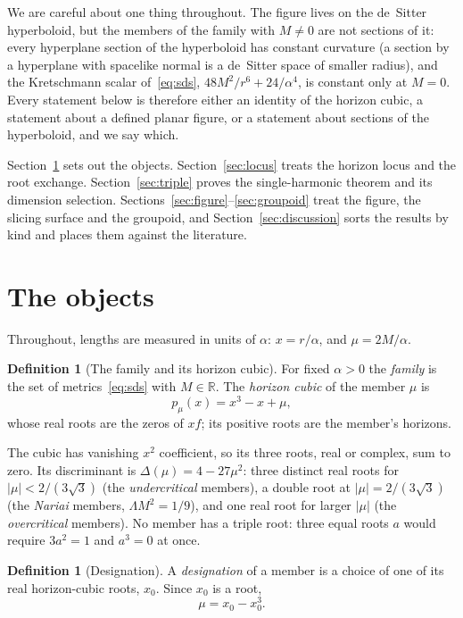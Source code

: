 \documentclass[11pt]{article}
\theoremstyle{plain}
\theoremstyle{definition}
\newtheorem{definition}[theorem]{Definition}
\theoremstyle{remark}
\begin{document}
We are careful about one thing throughout. The figure lives on the de~Sitter hyperboloid, but the members of the
family with $M\neq0$ are not sections of it: every hyperplane section of the hyperboloid has constant curvature
(a section by a hyperplane with spacelike normal is a de~Sitter space of smaller radius), and the Kretschmann scalar of~\eqref{eq:sds}, $48M^{2}/r^{6}+24/\alpha^{4}$, is constant only at
$M=0$. Every statement below is therefore either an identity of the horizon cubic, a statement about a defined
planar figure, or a statement about sections of the hyperboloid, and we say which.

Section~\ref{sec:defs} sets out the objects. Section~\ref{sec:locus} treats the horizon locus and the root
exchange. Section~\ref{sec:triple} proves the single-harmonic theorem and its dimension selection.
Sections~\ref{sec:figure}--\ref{sec:groupoid} treat the figure, the slicing surface and the groupoid, and Section~\ref{sec:discussion} sorts the results by kind and
places them against the literature.

\section{The objects}\label{sec:defs}

Throughout, lengths are measured in units of $\alpha$: $x=r/\alpha$, and $\mu=2M/\alpha$.

\begin{definition}[The family and its horizon cubic]\label{def:family}
For fixed $\alpha>0$ the \emph{family} is the set of metrics~\eqref{eq:sds} with $M\in\mathbb{R}$. The
\emph{horizon cubic} of the member $\mu$ is
\begin{equation}\label{eq:cubic}
p_{\mu}(x)=x^{3}-x+\mu,
\end{equation}
whose real roots are the zeros of $xf$; its positive roots are the member's horizons.
\end{definition}

The cubic has vanishing $x^{2}$ coefficient, so its three roots, real or complex, sum to zero. Its discriminant
is $\Delta(\mu)=4-27\mu^{2}$: three distinct real roots for $|\mu|<2/(3\sqrt3)$ (the \emph{undercritical}
members), a double root at $|\mu|=2/(3\sqrt3)$ (the \emph{Nariai} members, $\Lambda M^{2}=1/9$), and one real
root for larger $|\mu|$ (the \emph{overcritical} members). No member has a triple root: three equal roots $a$
would require $3a^{2}=1$ and $a^{3}=0$ at once.

\begin{definition}[Designation]\label{def:designation}
A \emph{designation} of a member is a choice of one of its real horizon-cubic roots, $x_{0}$. Since $x_{0}$ is a
root,
\begin{equation}\label{eq:designation}
\mu=x_{0}-x_{0}^{3}.
\end{equation}
\end{definition}
\end{document}
